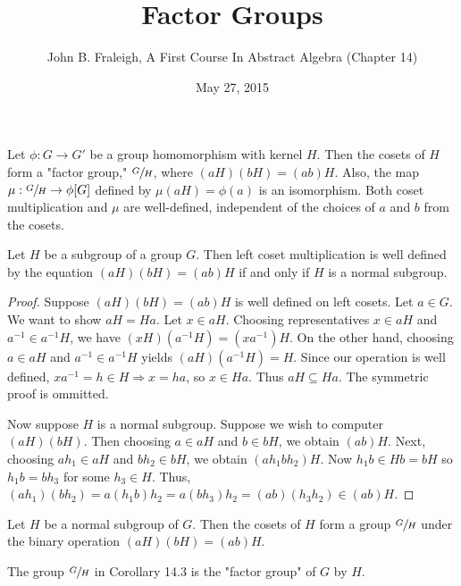 \documentclass[a4paper,11pt]{article}
\title{Factor Groups}
\author{John B. Fraleigh, A First Course In Abstract Algebra (Chapter 14)}
\date{May 27, 2015}
\begin{document}
\maketitle
{}

\begin{outline}

    Let \(\phi: G \rightarrow G'\) be a group homomorphism with kernel \(H\). Then the cosets of \(H\) form a 
    "factor group," \(\sfrac{G}{H}\), where \((aH)(bH) = (ab)H\). Also, the map \(\mu: \sfrac{G}{H} \rightarrow
    \phi[G]\) defined by \(\mu(aH) = \phi(a)\) is an isomorphism. Both coset multiplication and \(\mu\) are 
    well-defined, independent of the choices of \(a\) and \(b\) from the cosets.
    
    Let \(H\) be a subgroup of a group \(G\). Then left coset multiplication is well defined by the
    equation \((aH)(bH) = (ab)H\) if and only if \(H\) is a normal subgroup.
    
    \begin{proof}
      \forward
        Suppose \((aH)(bH) = (ab)H\) is well defined on left cosets. Let \(a \in G\). We want to show
        \(aH = Ha\). Let \(x \in aH\). Choosing representatives \(x \in aH\) and \(a^{-1} \in a^{-1}H\), we 
        have \((xH)(a^{-1}H) = (xa^{-1})H\). On the other hand, choosing \(a \in aH\) and \(a^{-1} \in 
        a^{-1}H\) yields \((aH)(a^{-1}H) = H\). Since our operation is well defined, \(xa^{-1} = h \in H 
        \Rightarrow x = ha\), so \(x \in Ha\). Thus \(aH \subseteq Ha\). The symmetric proof is ommitted.
        
      \backward
        Now suppose \(H\) is a normal subgroup. Suppose we wish to computer \((aH)(bH)\). Then choosing
        \(a \in aH\) and \(b \in bH\), we obtain \((ab)H\). Next, choosing \(ah_{1} \in aH\) and \(bh_{2} 
        \in bH\), we obtain \((ah_{1}bh_{2})H\). Now \(h_{1}b \in Hb = bH\) so \(h_{1}b = bh_{3}\) for 
        some \(h_{3} \in H\). Thus, \((ah_{1})(bh_{2}) = a(h_{1}b)h_{2} = a(bh_{3})h_{2} = (ab)(h_{3}h_{2}) 
        \in (ab)H\).
    \end{proof}
    
    Let \(H\) be a normal subgroup of \(G\). Then the cosets of \(H\) form a group \(\sfrac{G}{H}\)
    under the binary operation \((aH)(bH) = (ab)H\).
    
    The group \(\sfrac{G}{H}\) in Corollary 14.3 is the "factor group" of \(G\) by \(H\).
    

\end{outline}
\end{document}
